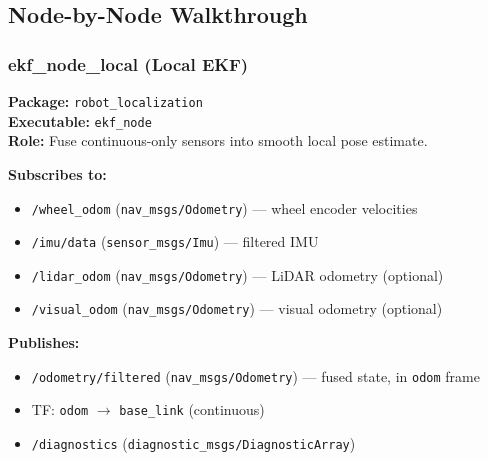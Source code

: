 \documentclass[11pt,a4paper]{article}
\begin{document}
\subsection{Node-by-Node Walkthrough}

\subsubsection{ekf\_node\_local (Local EKF)}

\textbf{Package:} \texttt{robot\_localization}\\
\textbf{Executable:} \texttt{ekf\_node}\\
\textbf{Role:} Fuse continuous-only sensors into smooth local pose estimate.

\textbf{Subscribes to:}
\begin{itemize}
\item \texttt{/wheel\_odom} (\texttt{nav\_msgs/Odometry}) --- wheel encoder velocities
\item \texttt{/imu/data} (\texttt{sensor\_msgs/Imu}) --- filtered IMU
\item \texttt{/lidar\_odom} (\texttt{nav\_msgs/Odometry}) --- LiDAR odometry (optional)
\item \texttt{/visual\_odom} (\texttt{nav\_msgs/Odometry}) --- visual odometry (optional)
\end{itemize}

\textbf{Publishes:}
\begin{itemize}
\item \texttt{/odometry/filtered} (\texttt{nav\_msgs/Odometry}) --- fused state, in \texttt{odom} frame
\item TF: \texttt{odom} $\to$ \texttt{base\_link} (continuous)
\item \texttt{/diagnostics} (\texttt{diagnostic\_msgs/DiagnosticArray})
\end{itemize}
\end{document}
